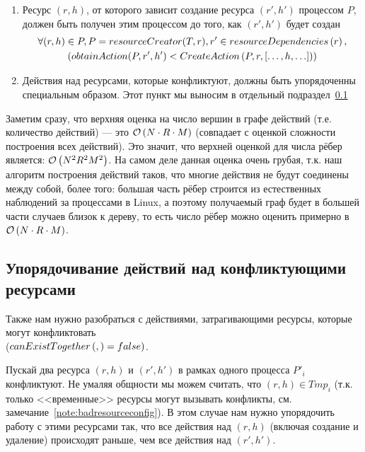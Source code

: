 \begin{enumerate}
	\item \label{chap2:preced:f} \label{chap2:preced:lastSimple} Ресурс $(r, h)$, от которого зависит создание ресурса $(r', h')$ процессом $P$, должен быть получен этим процессом до того, как $(r', h')$ будет создан
		\begin{gather*}
			\forall (r, h) \in P, P = resourceCreator(T, r), r' \in resourceDependencies\left( r \right), \\
			(obtainAction(P, r', h') < CreateAction\left( P, r, [\ldots, h, \ldots] \right))
		\end{gather*}

	\item \label{chap2:preced:g} Действия над ресурсами, которые конфликтуют, должны быть упорядоченны специальным образом. Этот пункт мы выносим в отдельный подраздел~\ref{chap2:subsec:conflictresolution}
\end{enumerate}

Заметим сразу, что верхняя оценка на число вершин в графе действий (т.е. количество действий) --- это $\mathcal{O}\left(N \cdot R \cdot M\right)$ (совпадает с оценкой сложности построения всех действий). Это значит, что верхней оценкой для числа рёбер является: $\mathcal{O}\left(N^2R^2M^2\right)$. На самом деле данная оценка очень грубая, т.к. наш алгоритм построения действий таков, что многие действия не будут соединены между собой, более того: большая часть рёбер строится из естественных наблюдений
за процессами в Linux, а поэтому получаемый граф будет в большей части случаев близок к дереву, то есть число рёбер можно оценить примерно в $\mathcal{O}\left(N\cdot R \cdot M\right)$.

\subsection{Упорядочивание действий над конфликтующими ресурсами}
\label{chap2:subsec:conflictresolution}

Также нам нужно разобраться с действиями, затрагивающими ресурсы, которые могут конфликтовать \\
($canExistTogether\left( ,  \right) = false)$. 

Пускай два ресурса $(r, h)$ и $(r', h')$ в рамках одного процесса $P'_i$ конфликтуют. 
Не умаляя общности мы можем считать, что $(r, h) \in Tmp_i$ 
(т.к. только <<временные>> ресурсы могут вызывать конфликты, см. замечание~\ref{note:badresourceconfig}). 
В этом случае нам нужно упорядочить работу с этими ресурсами так, что все действия над $(r, h)$ 
(включая создание и удаление) происходят раньше, чем все действия над $(r', h')$.

